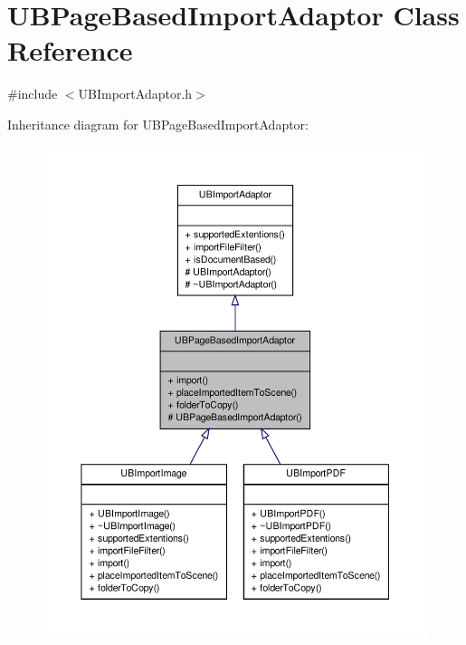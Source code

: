 \hypertarget{class_u_b_page_based_import_adaptor}{\section{U\-B\-Page\-Based\-Import\-Adaptor Class Reference}
\label{d5/d38/class_u_b_page_based_import_adaptor}
}


{\ttfamily \#include $<$U\-B\-Import\-Adaptor.\-h$>$}



Inheritance diagram for U\-B\-Page\-Based\-Import\-Adaptor\-:
\nopagebreak
\begin{figure}[H]
\begin{center}
\leavevmode
\includegraphics[width=350pt]{d9/df8/class_u_b_page_based_import_adaptor__inherit__graph}
\end{center}
\end{figure}


